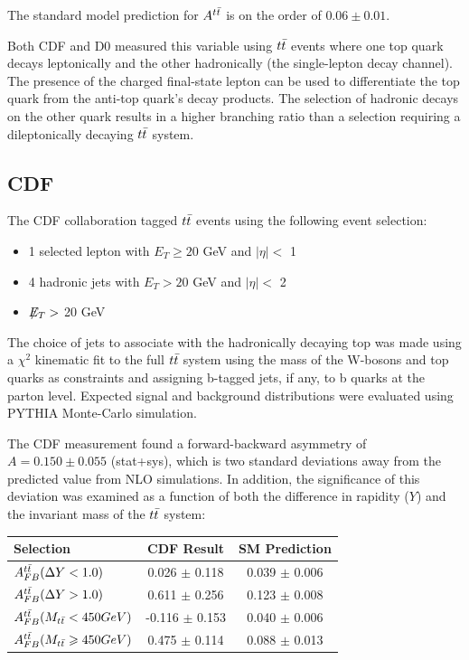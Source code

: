 The standard model prediction for $A^{t\bar{t}}$ is on the order of $0.06 \pm 0.01$.%

Both CDF and D0 measured this variable using $t\bar{t}$ events where one top quark decays leptonically and the other hadronically (the single-lepton decay channel).
The presence of the charged final-state lepton can be used to differentiate the top quark from the anti-top quark's decay products.
The selection of hadronic decays on the other quark results in a higher branching ratio than a selection requiring a dileptonically decaying $t\bar{t}$ system.


\subsection{CDF}

The CDF collaboration tagged $t\bar{t}$ events using the following event selection:
\begin{itemize}
  \item 1 selected lepton with $E_T \ge 20$ GeV and $| \eta | <$ 1
  \item 4 hadronic jets with $E_T  > 20$ GeV and $| \eta | <$ 2
  \item $\not\!\!{E_{T}} >$ 20 GeV
\end{itemize}

The choice of jets to associate with the hadronically decaying top was made using a $\chi^2$ kinematic fit to the full $t\bar{t}$ system using the mass of the W-bosons and top quarks as constraints and assigning b-tagged jets, if any, to b quarks at the parton level.
Expected signal and background distributions were evaluated using PYTHIA Monte-Carlo simulation.

The CDF measurement found a forward-backward asymmetry of $A = 0.150 \pm 0.055$ (stat+sys), which is two standard deviations away from the predicted value from NLO simulations.
In addition, the significance of this deviation was examined as a function of both the difference in rapidity ($Y$) and the invariant mass of the $t\bar{t}$ system:

\begin{tabular}{lcc}
\hline
Selection                         &   CDF Result    & SM Prediction \\
\hline
$A^{t\bar{t}}_{FB}( \Delta Y < 1.0)$  & 0.026 $\pm$ 0.118 & 0.039 $\pm$ 0.006 \\
$A^{t\bar{t}}_{FB}( \Delta Y > 1.0)$  & 0.611 $\pm$ 0.256 & 0.123 $\pm$ 0.008 \\
\hline
$A^{t\bar{t}}_{FB}( M_{t\bar{t}} < 450 GeV)$   & -0.116 $\pm$ 0.153 & 0.040 $\pm$ 0.006 \\
$A^{t\bar{t}}_{FB}( M_{t\bar{t}} \geqslant 450 GeV)$ & 0.475 $\pm$ 0.114  & 0.088 $\pm$ 0.013 \\
\hline
\end{tabular}

